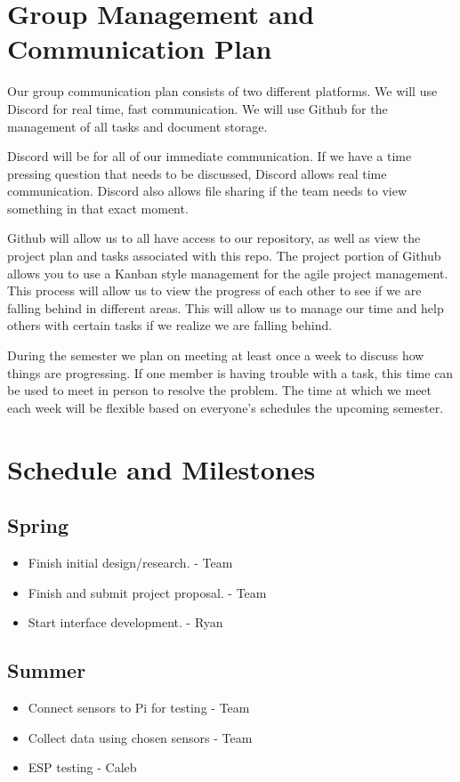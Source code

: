 \documentclass[letterpaper, 10 pt, conference]{ieeeconf}  %
\begin{document}
\section{Group Management and Communication Plan}
Our group communication plan consists of two different platforms. We will use Discord for real time, fast communication. We will use Github for the management of all tasks and document storage. 

Discord will be for all of our immediate communication. If we have a time pressing question that needs to be discussed, Discord allows real time communication. Discord also allows file sharing if the team needs to view something in that exact moment. 

Github will allow us to all have access to our repository, as well as view the project plan and tasks associated with this repo. The project portion of Github allows you to use a Kanban style management for the agile project management. This process will allow us to view the progress of each other to see if we are falling behind in different areas. This will allow us to manage our time and help others with certain tasks if we realize we are falling behind. 

During the semester we plan on meeting at least once a week to discuss how things are progressing. If one member is having trouble with a task, this time can be used to meet in person to resolve the problem. The time at which we meet each week will be flexible based on everyone's schedules the upcoming semester.

\section{Schedule and Milestones}
\subsection{Spring}
\begin{itemize}
    \item Finish initial design/research. - Team
    \item Finish and submit project proposal. - Team
    \item Start interface development. - Ryan
\end{itemize}

\subsection{Summer}
\begin{itemize}
    \item Connect sensors to Pi for testing - Team
    \item Collect data using chosen sensors - Team
    \item ESP testing - Caleb
\end{itemize}
\end{document}
